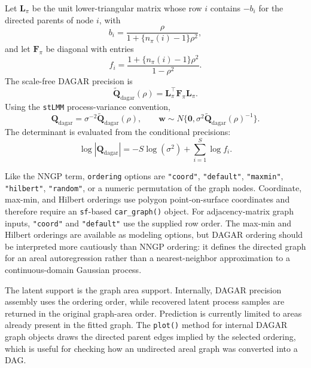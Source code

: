 \documentclass[11pt]{article}
\newcommand{\bw}{\bm{w}}
\newcommand{\bF}{\bm{F}}
\newcommand{\bL}{\bm{L}}
\newcommand{\bQ}{\bm{Q}}
\newcommand{\bzero}{\bm{0}}
\begin{document}
Let $\bL_\pi$ be the unit lower-triangular matrix whose row $i$ contains $-b_i$ for the directed parents of node $i$, with
\begin{equation}
  b_i =
  \frac{\rho}{1+\{n_\pi(i)-1\}\rho^2},
\end{equation}
and let $\bF_\pi$ be diagonal with entries
\begin{equation}
  f_i =
  \frac{1+\{n_\pi(i)-1\}\rho^2}{1-\rho^2}.
\end{equation}
The scale-free DAGAR precision is
\begin{equation}
  \widetilde{\bQ}_{\mathrm{dagar}}(\rho)
    =
    \bL_\pi^\top \bF_\pi \bL_\pi.
\end{equation}
Using the \texttt{stLMM} process-variance convention,
\begin{equation}
  \bQ_{\mathrm{dagar}}
    =
    \sigma^{-2}\widetilde{\bQ}_{\mathrm{dagar}}(\rho),
  \qquad
  \bw \sim
  N\{\bzero,\sigma^2\widetilde{\bQ}_{\mathrm{dagar}}(\rho)^{-1}\}.
\end{equation}
The determinant is evaluated from the conditional precisions:
\begin{equation}
  \label{eq:logdet-dagar}
  \log|\bQ_{\mathrm{dagar}}|
    =
    -S\log(\sigma^2)
    +
    \sum_{i=1}^S \log f_i.
\end{equation}

Like the NNGP term, \texttt{ordering} options are \texttt{"coord"}, \texttt{"default"}, \texttt{"maxmin"}, \texttt{"hilbert"}, \texttt{"random"}, or a numeric permutation of the graph nodes. Coordinate, max-min, and Hilbert orderings use polygon point-on-surface coordinates and therefore require an \texttt{sf}-based \texttt{car\_graph()} object. For adjacency-matrix graph inputs, \texttt{"coord"} and \texttt{"default"} use the supplied row order. The max-min and Hilbert orderings are available as modeling options, but DAGAR ordering should be interpreted more cautiously than NNGP ordering: it defines the directed graph for an areal autoregression rather than a nearest-neighbor approximation to a continuous-domain Gaussian process.

The latent support is the graph area support. Internally, DAGAR precision assembly uses the ordering order, while recovered latent process samples are returned in the original graph-area order. Prediction is currently limited to areas already present in the fitted graph. The \texttt{plot()} method for internal DAGAR graph objects draws the directed parent edges implied by the selected ordering, which is useful for checking how an undirected areal graph was converted into a DAG.
\end{document}
